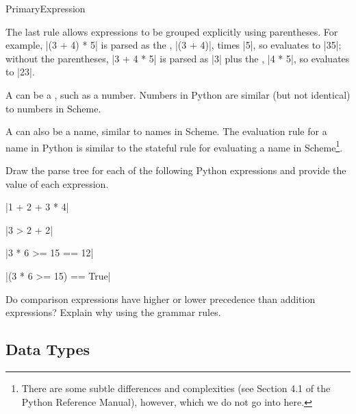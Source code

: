 \begin{bnfgrammarm}{PrimaryExpression}
\end{bnfgrammarm}
The last rule allows expressions to be grouped explicitly using parentheses.  For example, \pycode|(3 + 4) * 5| is parsed as the , \pycode|(3 + 4)|, times \pycode|5|, so evaluates to \presult|35|; without the parentheses, \pycode|3 + 4 * 5| is parsed as \pycode|3| plus the , \pycode|4 * 5|, so evaluates to \pycode|23|.

A  can be a , such as a number.  Numbers in Python are similar (but not identical) to numbers in Scheme.  %

A  can also be a name, similar to names in Scheme.  The evaluation rule for a name in Python is similar to the stateful rule for evaluating a name in Scheme\footnote{There are some subtle differences and complexities (see Section 4.1 of the Python Reference Manual), however, which we do not go into here.}.

\beforeex
\begin{exercise}
Draw the parse tree for each of the following Python expressions and provide the value of each expression.
\begin{subexerciselist}
\item \pycode|1 + 2 + 3 * 4|
\solution{\LATER{}}
\item \pycode|3 > 2 + 2|
\solution{\LATER{}}
\item \pycode|3 * 6 >= 15 == 12|
\solution{\LATER{}}
\item \pycode|(3 * 6 >= 15) == True|
\solution{\LATER{}}
\end{subexerciselist}
\end{exercise}
\afterex

\beforeex
\begin{exercise}
Do comparison expressions have higher or lower precedence than addition expressions?  Explain why using the grammar rules.
\solution{\LATER{}}
\end{exercise}
\afterex


\subsection{Data Types}\label{sec:pythonlists}

